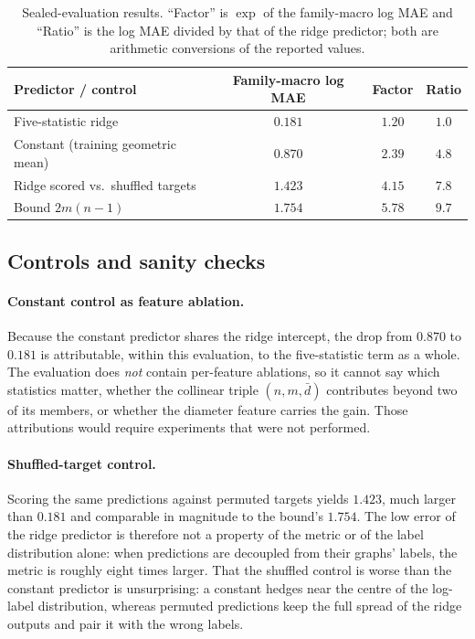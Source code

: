 \documentclass{article}
\begin{document}
\begin{table}[t]
\centering
\caption{Sealed-evaluation results. ``Factor'' is $\exp$ of the family-macro log MAE and ``Ratio'' is the log MAE divided by that of the ridge predictor; both are arithmetic conversions of the reported values.}
\label{tab:main}
\small
\begin{tabular}{lccc}
\toprule
Predictor / control & Family-macro log MAE & Factor & Ratio \\
\midrule
Five-statistic ridge & $0.181$ & $1.20$ & $1.0$ \\ %
Constant (training geometric mean) & $0.870$ & $2.39$ & $4.8$ \\ %
Ridge scored vs.\ shuffled targets & $1.423$ & $4.15$ & $7.8$ \\ %
Bound $2m(n-1)$ & $1.754$ & $5.78$ & $9.7$ \\ %
\bottomrule
\end{tabular}
\end{table}

\subsection{Controls and sanity checks}
\paragraph{Constant control as feature ablation.} Because the constant predictor shares the ridge intercept, the drop from $0.870$ to $0.181$ is attributable, within this evaluation, to the five-statistic term as a whole. The evaluation does \emph{not} contain per-feature ablations, so it cannot say which statistics matter, whether the collinear triple $(n,m,\bar d)$ contributes beyond two of its members, or whether the diameter feature carries the gain. Those attributions would require experiments that were not performed.

\paragraph{Shuffled-target control.} Scoring the same predictions against permuted targets yields $1.423$, much larger than $0.181$ and comparable in magnitude to the bound's $1.754$. The low error of the ridge predictor is therefore not a property of the metric or of the label distribution alone: when predictions are decoupled from their graphs' labels, the metric is roughly eight times larger. That the shuffled control is worse than the constant predictor is unsurprising: a constant hedges near the centre of the log-label distribution, whereas permuted predictions keep the full spread of the ridge outputs and pair it with the wrong labels.
\end{document}
